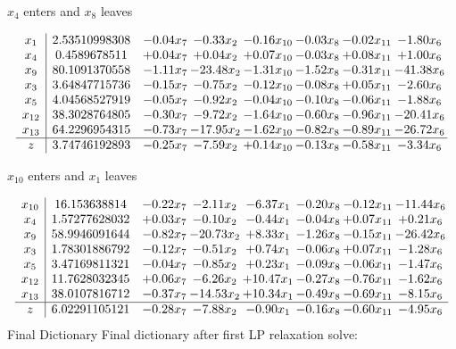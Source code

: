 \documentclass[8pt]{article}
\begin{document}
 $ x_{4} $ enters and $ x_{8} $ leaves 

 \[\begin{array}{c| c c@{\hskip 2pt} c@{\hskip 2pt} c@{\hskip 2pt} c@{\hskip 2pt} c@{\hskip 2pt} c@{\hskip 2pt} }
 x_{1}   &  2.53510998308 & -0.04 x_{7} & -0.33 x_{2} & -0.16 x_{10} & -0.03 x_{8} & -0.02 x_{11} & -1.80 x_{6}\\
 x_{4}   &  0.4589678511 & +  0.04 x_{7} & +  0.04 x_{2} & +  0.07 x_{10} & -0.03 x_{8} & +  0.08 x_{11} & +  1.00 x_{6}\\
 x_{9}   &  80.1091370558 & -1.11 x_{7} & -23.48 x_{2} & -1.31 x_{10} & -1.52 x_{8} & -0.31 x_{11} & -41.38 x_{6}\\
 x_{3}   &  3.64847715736 & -0.15 x_{7} & -0.75 x_{2} & -0.12 x_{10} & -0.08 x_{8} & +  0.05 x_{11} & -2.60 x_{6}\\
 x_{5}   &  4.04568527919 & -0.05 x_{7} & -0.92 x_{2} & -0.04 x_{10} & -0.10 x_{8} & -0.06 x_{11} & -1.88 x_{6}\\
 x_{12}   &  38.3028764805 & -0.30 x_{7} & -9.72 x_{2} & -1.64 x_{10} & -0.60 x_{8} & -0.96 x_{11} & -20.41 x_{6}\\
 x_{13}   &  64.2296954315 & -0.73 x_{7} & -17.95 x_{2} & -1.62 x_{10} & -0.82 x_{8} & -0.89 x_{11} & -26.72 x_{6}\\
\hline
z    &  3.74746192893 & -0.25 x_{7} & -7.59 x_{2} & +  0.14 x_{10} & -0.13 x_{8} & -0.58 x_{11} & -3.34 x_{6}\\
\end{array}\]


 $ x_{10} $ enters and $ x_{1} $ leaves 

 \[\begin{array}{c| c c@{\hskip 2pt} c@{\hskip 2pt} c@{\hskip 2pt} c@{\hskip 2pt} c@{\hskip 2pt} c@{\hskip 2pt} }
 x_{10}   &  16.153638814 & -0.22 x_{7} & -2.11 x_{2} & -6.37 x_{1} & -0.20 x_{8} & -0.12 x_{11} & -11.44 x_{6}\\
 x_{4}   &  1.57277628032 & +  0.03 x_{7} & -0.10 x_{2} & -0.44 x_{1} & -0.04 x_{8} & +  0.07 x_{11} & +  0.21 x_{6}\\
 x_{9}   &  58.9946091644 & -0.82 x_{7} & -20.73 x_{2} & +  8.33 x_{1} & -1.26 x_{8} & -0.15 x_{11} & -26.42 x_{6}\\
 x_{3}   &  1.78301886792 & -0.12 x_{7} & -0.51 x_{2} & +  0.74 x_{1} & -0.06 x_{8} & +  0.07 x_{11} & -1.28 x_{6}\\
 x_{5}   &  3.47169811321 & -0.04 x_{7} & -0.85 x_{2} & +  0.23 x_{1} & -0.09 x_{8} & -0.06 x_{11} & -1.47 x_{6}\\
 x_{12}   &  11.7628032345 & +  0.06 x_{7} & -6.26 x_{2} & + 10.47 x_{1} & -0.27 x_{8} & -0.76 x_{11} & -1.62 x_{6}\\
 x_{13}   &  38.0107816712 & -0.37 x_{7} & -14.53 x_{2} & + 10.34 x_{1} & -0.49 x_{8} & -0.69 x_{11} & -8.15 x_{6}\\
\hline
z    &  6.02291105121 & -0.28 x_{7} & -7.88 x_{2} & -0.90 x_{1} & -0.16 x_{8} & -0.60 x_{11} & -4.95 x_{6}\\
\end{array}\]
Final Dictionary
Final dictionary after first LP relaxation solve: 
\end{document}
